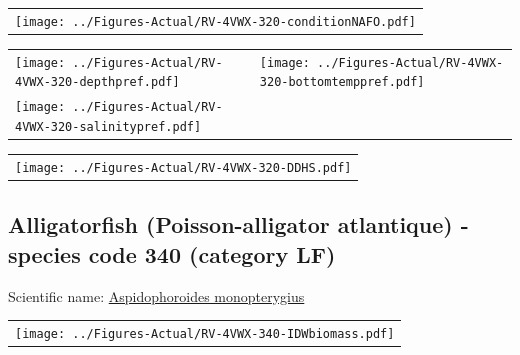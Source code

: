 \documentclass[12pt]{article}\usepackage[]{graphicx}\usepackage[]{color}
\begin{document}
\vspace{1cm}
\begin{minipage}{1.0\textwidth}
 \begin{tabular}{c}
\texttt{[image: ../Figures-Actual/RV-4VWX-320-conditionNAFO.pdf]} \\ 
\end{tabular} 
\end{minipage}
\clearpage
\begin{minipage}{1.0\textwidth}
 \begin{tabular}[t]{m{3in}m{3in}}
\texttt{[image: ../Figures-Actual/RV-4VWX-320-depthpref.pdf]} & 
\texttt{[image: ../Figures-Actual/RV-4VWX-320-bottomtemppref.pdf]} \\ 
\texttt{[image: ../Figures-Actual/RV-4VWX-320-salinitypref.pdf]} & 
 \\ 
\end{tabular} 
\end{minipage}
\newline

\vspace{1cm}
\begin{minipage}{1.0\textwidth}
 \begin{tabular}{c}
\texttt{[image: ../Figures-Actual/RV-4VWX-320-DDHS.pdf]} \\ 
\end{tabular} 
\end{minipage}
\clearpage

\renewcommand\thefigure{\thesubsection\Alph{figure}}

\setcounter{figure}{0}

\hypertarget{sec:340}{%
\subsection{Alligatorfish (Poisson-alligator atlantique) - species code 340 (category LF)}\label{sec:340}}

  


Scientific name: \href{http://www.marinespecies.org/aphia.php?p=taxdetails\&id=159459}{Aspidophoroides monopterygius} \newline
\begin{minipage}{1.0\textwidth}
 \begin{tabular}{c}
\texttt{[image: ../Figures-Actual/RV-4VWX-340-IDWbiomass.pdf]} \\ 
\end{tabular} 
\end{minipage}
\newline
\end{document}
